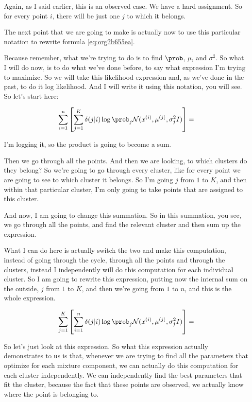 \documentclass[a4paper, 12pt]{article}
\begin{document}
Again, as I said earlier, this is an observed case. We have a hard assignment.
So for every point \(i\), there will be just one \(j\) to which it belongs.

The next point that we are going to make is actually now to use this particular
notation to rewrite formula \ref{eq:org2b655ea}.

Because remember, what we're trying to do is to find \(\prob\), \(\mu\), and
\(\sigma^2\). So what I will do now, is to do what we've done before, to say
what expression I'm trying to maximize. So we will take this likelihood
expression and, as we've done in the past, to do it log likelihood. And I will
write it using this notation, you will see. So let's start here:

\begin{equation}
\label{eq:org1636dae}
\sum_{i=1}^{n} \left[ \sum_{j=1}^{K} \delta(j|i) \log \prob_j \mathcal{N}(x^{(i)}, \mu^{(j)}, \sigma_{j}^{2} I) \right] =
\end{equation}

I'm logging it, so the product is going to become a sum.

Then we go through all the points. And then we are looking, to which clusters do
they belong? So we're going to go through every cluster, like for every point we
are going to see to which cluster it belongs. So I'm going \(j\) from \(1\) to
\(K\), and then within that particular cluster, I'm only going to take points
that are assigned to this cluster.

And now, I am going to change this summation. So in this summation, you see, we
go through all the points, and find the relevant cluster and then sum up the
expression.

What I can do here is actually switch the two and make this computation, instead
of going through the cycle, through all the points and through the clusters,
instead I independently will do this computation for each individual cluster. So
I am going to rewrite this expression, putting now the internal sum on the
outside, \(j\) from \(1\) to \(K\), and then we're going from \(1\) to \(n\),
and this is the whole expression.

\begin{equation}
\label{eq:orgd578300}
\sum_{j=1}^{K} \left[ \sum_{i=1}^{n} \delta(j|i) \log \prob_j \mathcal{N}(x^{(i)}, \mu^{(j)}, \sigma_{j}^{2} I) \right] =
\end{equation}


So let's just look at this expression. So what this expression actually
demonstrates to us is that, whenever we are trying to find all the parameters
that optimize for each mixture component, we can actually do this computation
for each cluster independently. We can independently find the best parameters
that fit the cluster, because the fact that these points are observed, we
actually know where the point is belonging to.
\end{document}
